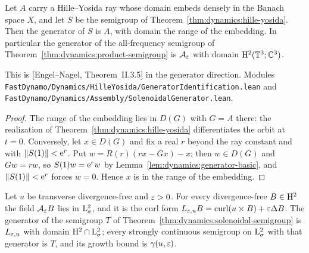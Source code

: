 \begin{lemma}
  \label{lem:dynamics:hille-yosida-generator}
  \leanok
  Let $A$ carry a Hille--Yosida ray whose domain embeds densely in the Banach space $X$, and let
  $S$ be the semigroup of Theorem~\ref{thm:dynamics:hille-yosida}.  Then the generator of $S$
  is $A$, with domain the range of the embedding.  In particular the generator of the
  all-frequency semigroup of Theorem~\ref{thm:dynamics:product-semigroup} is $\mathcal A_\varepsilon$
  with domain $\mathrm{H}^2(\mathbb{T}^3;\mathbb{C}^3)$.
\end{lemma}

This is [Engel--Nagel, Theorem~II.3.5] in the generator direction.  Modules
\texttt{FastDynamo/Dynamics/HilleYosida/GeneratorIdentification.lean} and
\texttt{FastDynamo/Dynamics/Assembly/SolenoidalGenerator.lean}.

\begin{proof}
  \leanok
  The range of the embedding lies in $D(G)$ with $G=A$ there: the realization of
  Theorem~\ref{thm:dynamics:hille-yosida} differentiates the orbit at $t=0$.  Conversely, let
  $x\in D(G)$ and fix a real $r$ beyond the ray constant and with $\left\|S(1)\right\|<\mathrm{e}^r$.  Put
  $w=R(r)(rx-Gx)-x$; then $w\in D(G)$ and $Gw=rw$, so $S(1)w=\mathrm{e}^rw$ by
  Lemma~\ref{lem:dynamics:generator-basic}, and $\left\|S(1)\right\|<\mathrm{e}^r$ forces $w=0$.  Hence $x$
  is in the range of the embedding.
\end{proof}

\begin{theorem}
  \label{thm:dynamics:solenoidal-generator}
  \leanok
  Let $u$ be transverse divergence-free and $\varepsilon>0$.  For every divergence-free
  $B\in\mathrm{H}^2$ the field $\mathcal A_\varepsilon B$ lies in $\mathrm{L}^2_\sigma$, and it is the curl form
  $L_{\varepsilon,u}B=\operatorname{curl}(u\times B)+\varepsilon\Delta B$.  The generator of the semigroup $T$ of
  Theorem~\ref{thm:dynamics:solenoidal-semigroup} is $L_{\varepsilon,u}$ with domain
  $\mathrm{H}^2\cap\mathrm{L}^2_\sigma$; every strongly continuous semigroup on $\mathrm{L}^2_\sigma$ with that
  generator is $T$, and its growth bound is $\gamma(u,\varepsilon)$.
\end{theorem}

